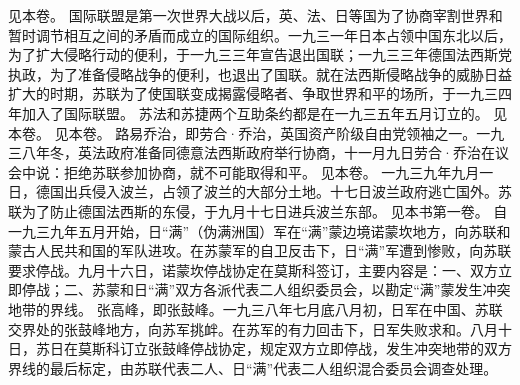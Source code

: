 \begin{maonote}
见本卷。
国际联盟是第一次世界大战以后，英、法、日等国为了协商宰割世界和暂时调节相互之间的矛盾而成立的国际组织。一九三一年日本占领中国东北以后，为了扩大侵略行动的便利，于一九三三年宣告退出国联；一九三三年德国法西斯党执政，为了准备侵略战争的便利，也退出了国联。就在法西斯侵略战争的威胁日益扩大的时期，苏联为了使国联变成揭露侵略者、争取世界和平的场所，于一九三四年加入了国际联盟。
苏法和苏捷两个互助条约都是在一九三五年五月订立的。
见本卷。
见本卷。
路易乔治，即劳合·乔治，英国资产阶级自由党领袖之一。一九三八年冬，英法政府准备同德意法西斯政府举行协商，十一月九日劳合·乔治在议会中说：拒绝苏联参加协商，就不可能取得和平。
见本卷。
一九三九年九月一日，德国出兵侵入波兰，占领了波兰的大部分土地。十七日波兰政府逃亡国外。苏联为了防止德国法西斯的东侵，于九月十七日进兵波兰东部。
见本书第一卷。
自一九三九年五月开始，日“满”（伪满洲国）军在“满”蒙边境诺蒙坎地方，向苏联和蒙古人民共和国的军队进攻。在苏蒙军的自卫反击下，日“满”军遭到惨败，向苏联要求停战。九月十六日，诺蒙坎停战协定在莫斯科签订，主要内容是：一、双方立即停战；二、苏蒙和日“满”双方各派代表二人组织委员会，以勘定“满”蒙发生冲突地带的界线。
张高峰，即张鼓峰。一九三八年七月底八月初，日军在中国、苏联交界处的张鼓峰地方，向苏军挑衅。在苏军的有力回击下，日军失败求和。八月十日，苏日在莫斯科订立张鼓峰停战协定，规定双方立即停战，发生冲突地带的双方界线的最后标定，由苏联代表二人、日“满”代表二人组织混合委员会调查处理。
\end{maonote}
